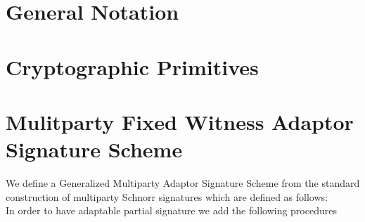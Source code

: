 \section{General Notation}\label{secGenNot}
\section{Cryptographic Primitives}\label{secCrypPrim}
\section{Mulitparty Fixed Witness Adaptor Signature Scheme} \label{secScheme}

We define a Generalized Multiparty Adaptor Signature Scheme from the standard construction of multiparty Schnorr signatures which
are defined as follows:\\

\fbox{
    \parbox{\textwidth}{
        \procedure[linenumbering, syntaxhighlight=auto]{\procGen} {
            \varK \sample \cnstZq \\
            \varR \sample \cnstZq \\
            \pcreturn (\varK, \varR)
        }
        \procedure[linenumbering, syntaxhighlight=auto]{\procGenPartSig} {
            \varE = \funH{(\varM \opConc \varGk + \varGkSt \opConc \varGr + \varGrSt)} \\
            \varSigPart = \varK + \varE + \varR \\
            \pcreturn (\varSigPart, \varGk, \varGr)
        }\\
        \procedure[linenumbering, syntaxhighlight=auto]{\procVerfPartSig} {
            \varE = \funH{((\varM \opConc \varGk + \varGkSt \opConc \varGr + \varGrSt)} \\
            \pcreturn \varGSigPart = \varGkSt + \funGen{\varE * \varR}
        }\\
        \procedure[linenumbering, syntaxhighlight=auto]{\procFinSig} {
            \pcreturn (\varSigPart + \varSigPartSt, \varGk + \varGkSt, \varGr + \varGrSt)
        }
    }
}
In order to have adaptable partial signature we add the following procedures\\

\fbox{
    \parbox{\textwidth} {
        \procedure[linenumbering, syntaxhighlight=auto]{\procAptSig} {
            \varSigPartApt = \varSigPart + \varX \\
            \pcreturn (\varSigPartApt, \varGx)
        }
        \procedure[linenumbering, syntaxhighlight=auto]{\procExtWit}{
            \varSigPartSt = \varSigFin - \varSigPart \\
            \varX = \varSigPartAptSt - \varSigPartSt \\
            \pcreturn (\varX)
        }\\
        \procedure[linenumbering, syntaxhighlight=auto]{\procAptSig} {
            \varE = \funH{(\varM \opConc \varGk + \varGkSt \opConc \varGr + \varGrSt)} \\
            \pcreturn \varGSigPartAptSt = \varGkSt + \funGen{\varE * \varR} + \varGx
        }
    }
}